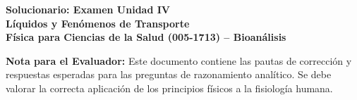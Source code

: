 \documentclass[11pt,letterpaper]{article}
\begin{document}
\begin{center}
    \textbf{\Large Solucionario: Examen Unidad IV}\\
    \textbf{\large Líquidos y Fenómenos de Transporte}\\
    \vspace{0.2cm}
    \textbf{Física para Ciencias de la Salud (005-1713) -- Bioanálisis}\\
\end{center}

\vspace{0.2cm}

\textbf{Nota para el Evaluador:} Este documento contiene las pautas de corrección y respuestas esperadas para las preguntas de razonamiento analítico. Se debe valorar la correcta aplicación de los principios físicos a la fisiología humana.

\vspace{0.2cm}
\end{document}
